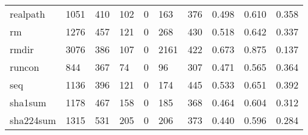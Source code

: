 \begin{longtable}{lp{1.3cm}p{1.3cm}p{1.3cm}p{1.3cm}p{1.3cm}p{1.3cm}p{1.3cm}p{1.3cm}p{1.3cm}}
realpath  &                   1051 &                                410 &                               102 &                                0 &                               163 &                             376 &                                   0.498 &                                  0.610 &                                0.358 \\
rm        &                   1276 &                                457 &                               121 &                                0 &                               268 &                             430 &                                   0.518 &                                  0.642 &                                0.337 \\
rmdir     &                   3076 &                                386 &                               107 &                                0 &                              2161 &                             422 &                                   0.673 &                                  0.875 &                                0.137 \\
runcon    &                    844 &                                367 &                                74 &                                0 &                                96 &                             307 &                                   0.471 &                                  0.565 &                                0.364 \\
seq       &                   1136 &                                396 &                               121 &                                0 &                               174 &                             445 &                                   0.533 &                                  0.651 &                                0.392 \\
sha1sum   &                   1178 &                                467 &                               158 &                                0 &                               185 &                             368 &                                   0.464 &                                  0.604 &                                0.312 \\
sha224sum &                   1315 &                                531 &                               205 &                                0 &                               206 &                             373 &                                   0.440 &                                  0.596 &                                0.284 \\

\end{longtable}
